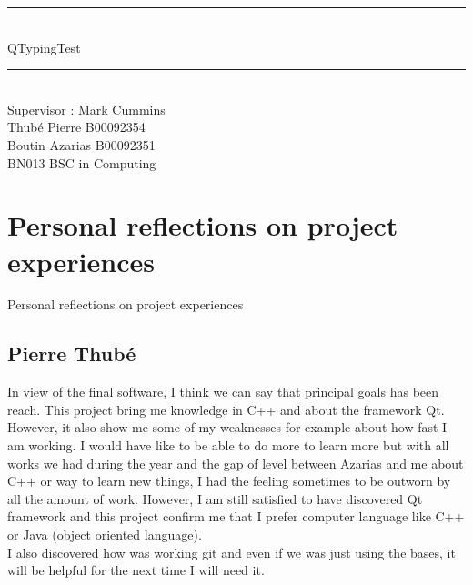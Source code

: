 \documentclass[11pt]{report}
\newcommand{\Mline}{\hrule \mbox{}\\[0.1cm]}
\begin{document}
\begin{titlepage}
\begin{center}


\Mline
{ \LARGE QTypingTest \\[0.4cm] }
\Mline

Supervisor : Mark Cummins\\[3cm]

Thubé Pierre B00092354\\
Boutin Azarias B00092351\\[2cm]
BN013 BSC in Computing

\end{center}
\end{titlepage}

\setcounter{page}{2}

\tableofcontents







\part{Personal reflections on project experiences}
Personal reflections on project experiences

\chapter{Pierre Thubé}
In view of the final software, I think we can say that principal goals has been reach. This project bring me knowledge in C++ and about the framework Qt. However, it also show me some of my weaknesses for example about how fast I am working. I would have like to be able to do more to learn more but with all works we had during the year and the gap of level between Azarias and me about C++ or way to learn new things, I had the feeling sometimes to be outworn by all the amount of work. However, I am still satisfied to have discovered Qt framework and this project confirm me that I prefer computer language like C++ or Java (object oriented language).\\
I also discovered how was working git and even if we was just using the bases, it will be helpful for the next time I will need it. 
\end{document}
